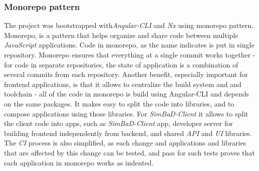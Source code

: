 \subsubsection{Monorepo pattern}
The project was bootstrapped with\textit{Angular-CLI} and \textit{Nx} using monorepo pattern. Monorepo, is a pattern that helps organize and share code between multiple \textit{JavaScript} applications. Code in monorepo, as the name indicates is put in single repository. Monorepo ensures that everything at a single commit works together - for code in separate repositories, the state of application is a combination of several commits from each repository. Another benefit, especially important for frontend applications, is that it allows to centralize the build system and and toolchain - all of the code in monorepo is build using Angular-CLI and depends on the same packages. It makes easy to split the code into libraries, and to compose applications using those libraries. For \textit{SimBaD-Client} it allows to split the client code into apps, such as \textit{SimBaD-Client} app, developer server for building frontend independently from backend, and shared \textit{API} and \textit{UI} libraries. The \textit{CI} process is also simplified, as each change and applications and libraries that are affected by this change can be tested, and pass for such tests proves that each application in monorepo works as indented.
